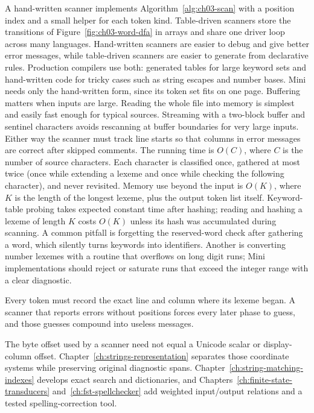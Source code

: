 A hand-written scanner implements Algorithm~\ref{alg:ch03-scan} with a position index and a small helper for each token kind.
Table-driven scanners store the transitions of Figure~\ref{fig:ch03-word-dfa} in arrays and share one driver loop across many languages.
Hand-written scanners are easier to debug and give better error messages, while table-driven scanners are easier to generate from declarative rules.
Production compilers use both: generated tables for large keyword sets and hand-written code for tricky cases such as string escapes and number bases.
Mini needs only the hand-written form, since its token set fits on one page.
Buffering matters when inputs are large.
Reading the whole file into memory is simplest and easily fast enough for typical sources.
Streaming with a two-block buffer and sentinel characters avoids rescanning at buffer boundaries for very large inputs.
Either way the scanner must track line starts so that columns in error messages are correct after skipped comments.
The running time is $O(C)$, where $C$ is the number of source characters.
Each character is classified once, gathered at most twice (once while extending a lexeme and once while checking the following character), and never revisited.
Memory use beyond the input is $O(K)$, where $K$ is the length of the longest lexeme, plus the output token list itself.
Keyword-table probing takes expected constant time after hashing; reading and hashing a lexeme of length $K$ costs $O(K)$ unless its hash was accumulated during scanning.
A common pitfall is forgetting the reserved-word check after gathering a word, which silently turns keywords into identifiers.
Another is converting number lexemes with a routine that overflows on long digit runs; Mini implementations should reject or saturate runs that exceed the integer range with a clear diagnostic.
\begin{ccwarning}
Every token must record the exact line and column where its lexeme began.
A scanner that reports errors without positions forces every later phase to guess, and those guesses compound into useless messages.
\end{ccwarning}

The byte offset used by a scanner need not equal a Unicode scalar or display-column offset.
Chapter~\ref{ch:strings-representation} separates those coordinate systems while preserving original diagnostic spans.
Chapter~\ref{ch:string-matching-indexes} develops exact search and dictionaries, and Chapters~\ref{ch:finite-state-transducers} and~\ref{ch:fst-spellchecker} add weighted input/output relations and a tested spelling-correction tool.


